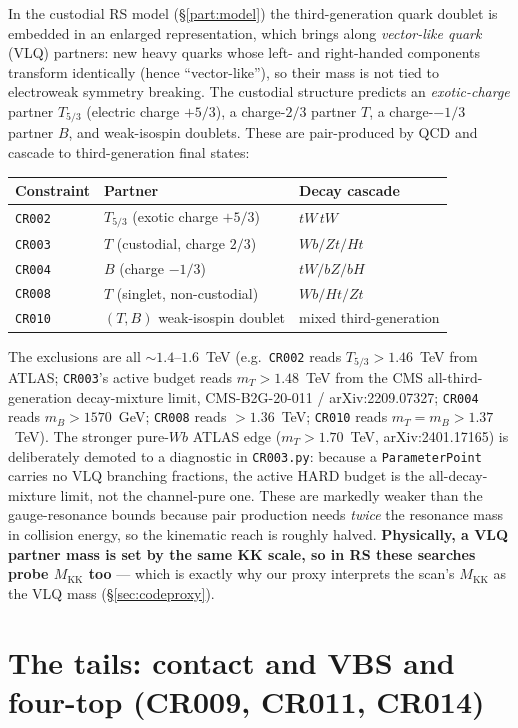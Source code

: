 \documentclass[11pt]{article}
\newcommand{\MKK}{M_{\mathrm{KK}}}
\newcommand{\code}[1]{\texttt{#1}}
\theoremstyle{definition}
\begin{document}
In the custodial RS model (\S\ref{part:model}) the third-generation quark
doublet is embedded in an enlarged representation, which brings along
\emph{vector-like quark} (VLQ) partners: new heavy quarks whose left- and
right-handed components transform identically (hence ``vector-like''), so their
mass is not tied to electroweak symmetry breaking. The custodial structure
predicts an \emph{exotic-charge} partner $T_{5/3}$ (electric charge $+5/3$), a
charge-$2/3$ partner $T$, a charge-$-1/3$ partner $B$, and weak-isospin
doublets. These are pair-produced by QCD and cascade to third-generation final
states:
\begin{center}
\begin{tabular}{lll}
\toprule
Constraint & Partner & Decay cascade \\
\midrule
\code{CR002} & $T_{5/3}$ (exotic charge $+5/3$) & $tW\,tW$ \\
\code{CR003} & $T$ (custodial, charge $2/3$) & $Wb/Zt/Ht$ \\
\code{CR004} & $B$ (charge $-1/3$) & $tW/bZ/bH$ \\
\code{CR008} & $T$ (singlet, non-custodial) & $Wb/Ht/Zt$ \\
\code{CR010} & $(T,B)$ weak-isospin doublet & mixed third-generation \\
\bottomrule
\end{tabular}
\end{center}
The exclusions are all $\sim 1.4$--$1.6$~TeV (e.g.\ \code{CR002} reads $T_{5/3}
> 1.46$~TeV from ATLAS; \code{CR003}'s active budget reads $m_T > 1.48$~TeV from
the CMS all-third-generation decay-mixture limit, CMS-B2G-20-011 /
arXiv:2209.07327; \code{CR004} reads $m_B > 1570$~GeV; \code{CR008} reads $>
1.36$~TeV; \code{CR010} reads $m_T = m_B > 1.37$~TeV). The stronger pure-$Wb$
ATLAS edge ($m_T > 1.70$~TeV, arXiv:2401.17165) is deliberately demoted to a
diagnostic in \code{CR003.py}: because a \code{ParameterPoint} carries no VLQ
branching fractions, the active HARD budget is the all-decay-mixture limit, not
the channel-pure one. These are markedly weaker than the gauge-resonance bounds because
pair production needs \emph{twice} the resonance mass in collision energy, so the
kinematic reach is roughly halved. \textbf{Physically, a VLQ partner mass is set
by the same KK scale, so in RS these searches probe $\MKK$ too} --- which is
exactly why our proxy interprets the scan's $\MKK$ as the VLQ mass
(\S\ref{sec:codeproxy}).

\section{The tails: contact and VBS and four-top (CR009, CR011, CR014)}
\label{sec:tails}
\end{document}
